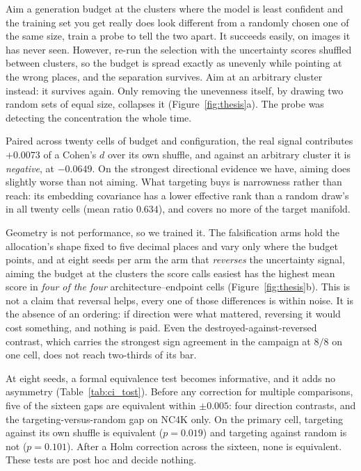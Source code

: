 \documentclass{article}
\begin{document}
Aim a generation budget at the clusters where the model is least confident and the training set you get really does
look different from a randomly chosen one of the same size, train a probe to tell the two apart. It succeeds easily, on images it has never seen. However, re-run the selection with the uncertainty
scores shuffled between clusters, so the budget is spread exactly as unevenly while pointing at the
wrong places, and the separation survives. Aim at an arbitrary cluster instead: it survives again.
Only removing the unevenness itself, by drawing two random sets of equal size, collapses it (Figure~\ref{fig:thesis}a). The probe was detecting the concentration the whole time.

Paired across twenty cells of budget and configuration, the real signal contributes $+0.0073$ of a
Cohen's $d$ over its own shuffle, and against an arbitrary cluster it is \emph{negative}, at
$-0.0649$. On the strongest directional evidence we have, aiming does slightly worse than not
aiming. What targeting buys is narrowness rather than reach: its embedding covariance has a lower
effective rank than a random draw's in all twenty cells (mean ratio $0.634$), and covers no more of
the target manifold.

Geometry is not performance, so we trained it. The falsification arms hold the allocation's shape fixed to five decimal places and vary
only where the budget points, and at eight seeds per arm the arm that \emph{reverses} the
uncertainty signal, aiming the budget at the clusters the score calls easiest has the highest
mean score in \textit{four of the four} architecture--endpoint cells (Figure~\ref{fig:thesis}b).
This is not a claim that reversal helps, every one of those differences is within noise. It is
the absence of an ordering: if direction were what mattered, reversing it would cost something, and
nothing is paid. Even the destroyed-against-reversed contrast, which carries the strongest sign
agreement in the campaign at $8/8$ on one cell, does not reach two-thirds of its bar.

At eight seeds, a formal equivalence test becomes informative, and it adds no asymmetry (Table~\ref{tab:ci_tost}).
Before any correction for multiple comparisons, five of the sixteen gaps are equivalent within $\pm 0.005$: four
direction contrasts, and the targeting-versus-random gap on NC4K only. On the primary cell, targeting against its own
shuffle is equivalent ($p = 0.019$) and targeting against random is not ($p = 0.101$). After a Holm correction across
the sixteen, none is equivalent. These tests are post hoc and decide nothing.
\end{document}

